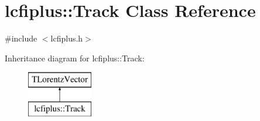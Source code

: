 \section{lcfiplus\+:\+:Track Class Reference}
\label{classlcfiplus_1_1Track}


{\ttfamily \#include $<$lcfiplus.\+h$>$}

Inheritance diagram for lcfiplus\+:\+:Track\+:\begin{figure}[H]
\begin{center}
\leavevmode
\includegraphics[height=2.000000cm]{classlcfiplus_1_1Track}
\end{center}
\end{figure}

